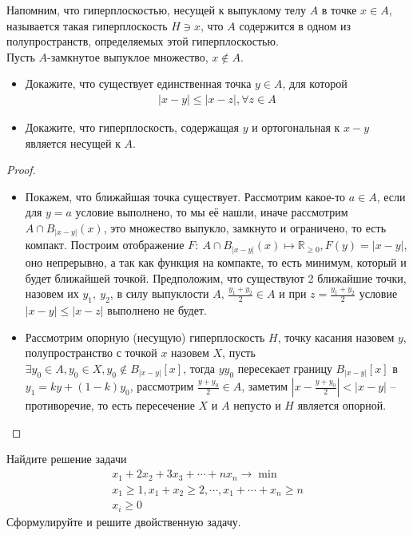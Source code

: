 \begin{prob}
    Напомним, что гиперплоскостью, несущей к выпуклому телу $A$ в точке $x \in A$, называется такая гиперплоскость $H \ni x$, что $A$ содержится в одном из полупространств, определяемых этой гиперплоскостью.\\
    Пусть $A$-замкнутое выпуклое множество, $x \notin A$.
    \begin{itemize}
    \item Докажите, что существует единственная точка $y \in A$, для которой
        \begin{gather*}
            |x-y| \leq|x-z|, \forall z \in A
        \end{gather*}
    \item Докажите, что гиперплоскость, содержащая $y$ и ортогональная к $x-y$ является несущей к $A$.
    \end{itemize}
\end{prob}
    
\begin{proof}
\text{ }
    \begin{itemize}
    \item Покажем, что ближайшая точка существует. Рассмотрим какое-то $a \in A$, если для $y = a$ условие выполнено, то мы её нашли, иначе рассмотрим $A \cap B_{|x-y|}(x)$, это множество выпукло, замкнуто и ограничено, то есть компакт. Построим отображение $F:\ A \cap B_{|x-y|}(x) \mapsto \mathbb{R}_{\geqslant 0}, F(y) = |x-y|$, оно непрерывно, а так как функция на компакте, то есть минимум, который и будет ближайшей точкой. Предположим, что существуют 2 ближайшие точки, назовем их $y_1,\ y_2$, в силу выпуклости $A$, $\frac{y_1 + y_2}{2} \in A$ и при $z = \frac{y_1 + y_2}{2}$ условие $|x - y| \leqslant |x - z|$ выполнено не будет.

    \item Рассмотрим опорную (несущую) гиперплоскость $H$, точку касания назовем $y$, полупространство с точкой $x$ назовем $X$, пусть $\exists y_0 \in A, y_0 \in X, y_0 \notin B_{|x-y|}[x]$, тогда $yy_0$ пересекает границу $B_{|x-y|}[x]$ в $y_1 = k y + (1 - k)y_0$, рассмотрим $\frac{y + y_0}{2} \in A$, заметим $|x - \frac{y + y_0}{2}| < |x - y|$ -- противоречие, то есть пересечение $X$ и $A$ непусто и $H$ является опорной.
    \end{itemize}
\end{proof}
\vskip 0.6in




\begin{prob}
    Найдите решение задачи
    \begin{gather*}
        x_{1}+2 x_{2}+3 x_{3}+\cdots+n x_{n} \rightarrow \min \\
        x_{1} \geqslant 1, x_{1}+x_{2} \geqslant 2, \cdots, x_{1}+\cdots+x_{n} \geqslant n \\
        x_{i} \geqslant 0
    \end{gather*}
    Сформулируйте и решите двойственную задачу.
\end{prob}


